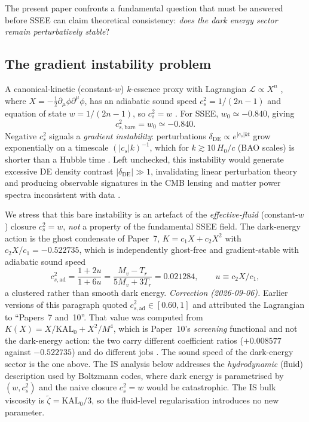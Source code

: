 \documentclass[12pt,a4paper]{article}
\newcommand{\KALz}{\mathrm{KAL}_0}
\newcommand{\ztilde}{\tilde{\zeta}}
\begin{document}
The present paper confronts a fundamental question that must be answered before
SSEE can claim theoretical consistency: \emph{does the dark energy sector remain
perturbatively stable}?

\subsection{The gradient instability problem}
\label{subsec:instability}

A canonical-kinetic (constant-$w$) $k$-essence proxy with Lagrangian $\mathcal{L} \propto X^n$
\citep{ArmendarizPicon2001},
where $X = -\tfrac{1}{2}\partial_\mu\phi\partial^\mu\phi$, has an adiabatic sound
speed $c^2_s = 1/(2n-1)$ and equation of state $w = 1/(2n-1)$, so $c^2_s = w$
\citep{Hu1998}.
For SSEE, $w_0 \simeq -0.840$, giving
\begin{equation}
  c^2_{s,\mathrm{bare}} = w_0 \simeq -0.840.
  \label{eq:cs2_bare}
\end{equation}
Negative $c^2_s$ signals a \emph{gradient instability}: perturbations
$\delta_{\mathrm{DE}} \propto e^{|c_s|kt}$ grow exponentially on a timescale
$(|c_s|k)^{-1}$, which for $k \gtrsim 10\,H_0/c$ (BAO scales) is shorter than a
Hubble time \citep{Caldwell2002}.
Left unchecked, this instability would generate excessive DE density contrast
$|\delta_{\mathrm{DE}}| \gg 1$, invalidating linear perturbation theory and
producing observable signatures in the CMB lensing and matter power spectra
inconsistent with data \citep{Calabrese2011}.

We stress that this bare instability is an artefact of the \emph{effective-fluid}
(constant-$w$) closure $c^2_s = w$, \emph{not} a property of the fundamental SSEE
field. The dark-energy action is the ghost condensate of Paper~7,
$K = c_1X + c_2X^2$ with $c_2X/c_1 = -0.522735$, which is independently
ghost-free and gradient-stable with adiabatic sound speed
\begin{equation}
  c^2_{s,\mathrm{ad}} = \frac{1+2u}{1+6u} = \frac{M_v-T_r}{5M_v+3T_r}
  = 0.021284 ,
  \qquad u \equiv c_2X/c_1 ,
\end{equation}
a clustered rather than smooth dark energy.
%
\emph{Correction (2026-09-06).} Earlier versions of this paragraph quoted
$c^2_{s,\mathrm{ad}}\in[0.60,1]$ and attributed the Lagrangian to ``Papers~7
and~10''. That value was computed from $K(X)=X/\KALz+X^2/M^4$, which is
Paper~10's \emph{screening} functional and not the dark-energy action: the two
carry different coefficient ratios ($+0.008577$ against $-0.522735$) and do
different jobs \citep{SSEE_Paper10}. The sound speed of the dark-energy sector
is the one above.
The IS analysis below addresses the \emph{hydrodynamic} (fluid) description used
by Boltzmann codes, where dark energy is parametrised by $(w, c^2_s)$ and the
naive closure $c^2_s = w$ would be catastrophic.
The IS bulk viscosity is $\ztilde = \KALz/3$, so the fluid-level regularisation
introduces no new parameter.
\end{document}
